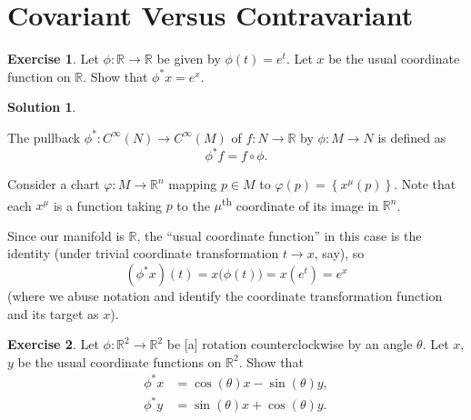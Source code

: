 \documentclass[11pt, a4paper]{report}
\theoremstyle{definition}
\newtheorem{exercise}{Exercise}[part]
\newtheorem{solution}{Solution}[part]
\newenvironment{ex}{\begin{exercise}}{\end{exercise}\pagebreak[1]}
\newenvironment{sol}{\begin{solution}}{\end{solution}\pagebreak[3]}
\newenvironment{nowidthtags}{\usetagform{nowidth}}{\ignorespacesafterend}
\begin{document}
\section{Covariant Versus Contravariant}

\begin{ex}

Let $\phi: \mathbb{R} \to \mathbb{R}$ be given by $\phi(t) = e^t$.
Let $x$ be the usual coordinate function on $\mathbb{R}$.
Show that $\phi^* x = e^x$.

\end{ex}

\begin{sol}\label{sol:pullbackexponential}

The pullback $\phi^*: C^\infty(N) \to C^\infty(M) $ of $f: N \to \mathbb{R}$ by $\phi: M \to N$ is defined as
\begin{nowidthtags}
\[
    \phi^*f = f \circ \phi. \tag{pullback of a function}\label{eq:pullbackfunction}
\]
\end{nowidthtags}

Consider a chart $\varphi: M \to \mathbb{R}^n$ mapping $p \in M$ to $\varphi(p) = \left\{x^\mu(p)\right\}$.
Note that each $x^\mu$ is a function taking $p$ to the $\mu$\textsuperscript{th} coordinate of its image in $\mathbb{R}^n$.

Since our manifold is $\mathbb{R}$, the ``usual coordinate function'' in this case is the identity (under trivial coordinate transformation $t \to x$, say), so
\[
    (\phi^* x)(t) = x \bigl( \phi(t) \bigr) = x(e^t) = e^x
\]
(where we abuse notation and identify the coordinate transformation function and its target as $x$).

\end{sol}

\begin{ex}

Let $\phi: \mathbb{R}^2 \to \mathbb{R}^2$ be [a] rotation counterclockwise by an angle $\theta$. Let $x$, $y$ be the usual coordinate functions on $\mathbb{R}^2$. Show that
\begin{align*}
    \phi^* x &= \cos(\theta) x - \sin(\theta) y, \\
    \phi^* y &= \sin(\theta) x + \cos(\theta) y.
\end{align*}

\end{ex}
\end{document}
